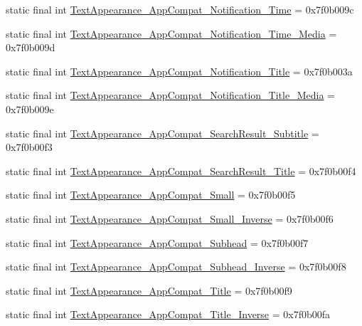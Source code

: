 \begin{CompactItemize}
\item 
static final int \hyperlink{classandroid_1_1support_1_1v4_1_1_r_1_1style_aa8e1ab4998c80d070a17b951e454546}{TextAppearance\_\-AppCompat\_\-Notification\_\-Time} = 0x7f0b009c
\item 
static final int \hyperlink{classandroid_1_1support_1_1v4_1_1_r_1_1style_1ccd374a20db43090654c43a60e8ed9d}{TextAppearance\_\-AppCompat\_\-Notification\_\-Time\_\-Media} = 0x7f0b009d
\item 
static final int \hyperlink{classandroid_1_1support_1_1v4_1_1_r_1_1style_b7ffd664698afb6525eb6b6d8e23cad7}{TextAppearance\_\-AppCompat\_\-Notification\_\-Title} = 0x7f0b003a
\item 
static final int \hyperlink{classandroid_1_1support_1_1v4_1_1_r_1_1style_4b64b9674c85be7e35dcb77338e21536}{TextAppearance\_\-AppCompat\_\-Notification\_\-Title\_\-Media} = 0x7f0b009e
\item 
static final int \hyperlink{classandroid_1_1support_1_1v4_1_1_r_1_1style_e12d1e6481cbd574701ef51c76d00bfe}{TextAppearance\_\-AppCompat\_\-SearchResult\_\-Subtitle} = 0x7f0b00f3
\item 
static final int \hyperlink{classandroid_1_1support_1_1v4_1_1_r_1_1style_6bd42cfc82af1751dc0891531323d8b8}{TextAppearance\_\-AppCompat\_\-SearchResult\_\-Title} = 0x7f0b00f4
\item 
static final int \hyperlink{classandroid_1_1support_1_1v4_1_1_r_1_1style_1565aca7c07f454036c08fa822df450b}{TextAppearance\_\-AppCompat\_\-Small} = 0x7f0b00f5
\item 
static final int \hyperlink{classandroid_1_1support_1_1v4_1_1_r_1_1style_b8a1a2e355682975c8ae82a09dfa6013}{TextAppearance\_\-AppCompat\_\-Small\_\-Inverse} = 0x7f0b00f6
\item 
static final int \hyperlink{classandroid_1_1support_1_1v4_1_1_r_1_1style_30da7049bc4f7a9217380cb91bb5cc2a}{TextAppearance\_\-AppCompat\_\-Subhead} = 0x7f0b00f7
\item 
static final int \hyperlink{classandroid_1_1support_1_1v4_1_1_r_1_1style_da5f932e510d69331ecf622d8df4f049}{TextAppearance\_\-AppCompat\_\-Subhead\_\-Inverse} = 0x7f0b00f8
\item 
static final int \hyperlink{classandroid_1_1support_1_1v4_1_1_r_1_1style_0ade342574078af852a0c800ee174f5e}{TextAppearance\_\-AppCompat\_\-Title} = 0x7f0b00f9
\item 
static final int \hyperlink{classandroid_1_1support_1_1v4_1_1_r_1_1style_3275affb97e2804bbe908cfa56241776}{TextAppearance\_\-AppCompat\_\-Title\_\-Inverse} = 0x7f0b00fa

\end{CompactItemize}
